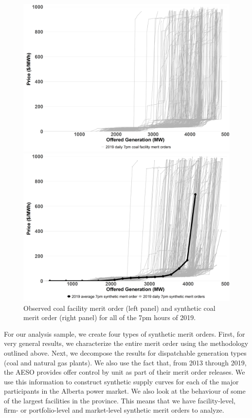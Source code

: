 \documentclass[12pt]{article}
\begin{document}
\begin{figure}[t]
    \centering
    \begin{minipage}{.5\textwidth}
        \centering
        \includegraphics[width=.9\textwidth]{../images/all_coal_merit.png}
    \end{minipage}%
    \begin{minipage}{0.5\textwidth}
        \centering
        \includegraphics[width=.9\textwidth]{../images/coal_synth_2019}
    \end{minipage}
    \caption{Observed coal facility merit order (left panel) and synthetic coal merit order (right panel) for all of the 7pm hours of 2019.}
    \label{fig:synth_coal_2019}
\end{figure}

For our analysis sample, we create four types of synthetic merit orders. First, for very general results, we characterize the entire merit order using the methodology outlined above. Next, we decompose the results for dispatchable generation types (coal and natural gas plants). We also use the fact that, from 2013 through 2019, the AESO provides offer control by unit as part of their merit order releases. We use this information to construct synthetic supply curves for each of the major participants in the Alberta power market. We also look at the behaviour of some of the largest facilities in the province. This means that we have facility-level, firm- or portfolio-level and market-level synthetic merit orders to analyze.
\end{document}
